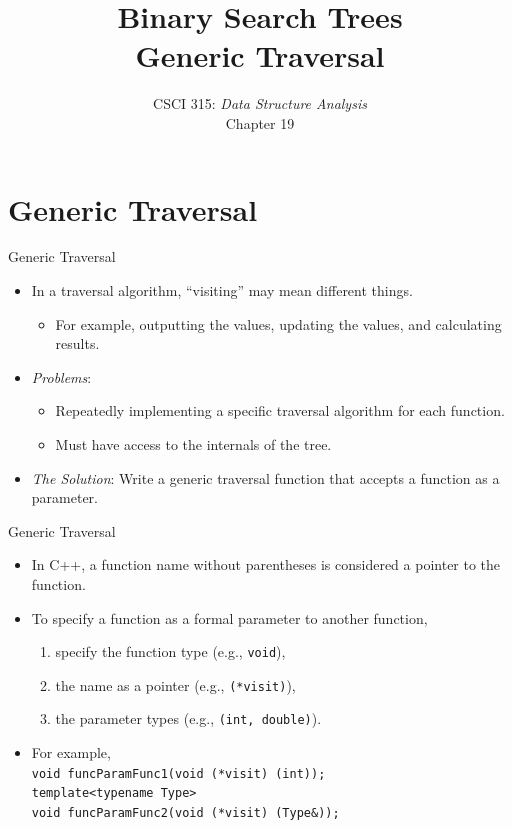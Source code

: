 \documentclass[14pt,aspectratio=1610]{beamer}
\title{\Huge{} Binary Search Trees\\Generic Traversal}
\subtitle{CSCI 315: \textit{Data Structure Analysis}\\Chapter 19}
\institute{Charleston Southern University}
\begin{document}
\begin{frame}
  \titlepage{}
\end{frame}

\section{Generic Traversal}
\begin{frame}{Generic Traversal}
  \begin{itemize}[<+->]
    \item
      In a traversal algorithm, ``visiting'' may mean different things.
      \begin{itemize}
        \item For example, outputting the values, updating the values, and calculating results.
      \end{itemize}
    \item
      \emph{Problems}:
      \begin{itemize}
        \item
          Repeatedly implementing a specific traversal algorithm for each function.
        \item 
          Must have access to the internals of the tree.
      \end{itemize}
    \item
      \emph{The Solution}: Write a generic traversal function that accepts a function as a parameter.
  \end{itemize}
\end{frame}

\begin{frame}{Generic Traversal}
  \begin{itemize}[<+->]
    \item
      In C++, a function name without parentheses is considered a pointer to the function.
    \item
      To specify a function as a formal parameter to another function,
      \begin{enumerate}
        \item specify the function type (e.g., \lstinline{void}),
        \item the name as a pointer (e.g., \lstinline{(*visit)}),
        \item the parameter types (e.g., \lstinline{(int, double)}).
      \end{enumerate}
    \item For example,\\
      \lstinline{void funcParamFunc1(void (*visit) (int));}\\[1em]
      \lstinline{template<typename Type>}\\
      \lstinline{void funcParamFunc2(void (*visit) (Type&));}
  \end{itemize}
\end{frame}
\end{document}

